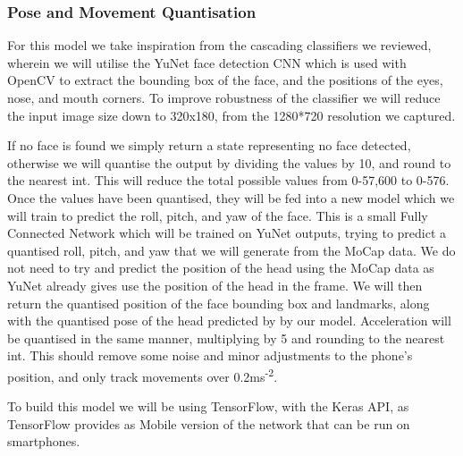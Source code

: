 \subsubsection{Pose and Movement Quantisation}\nl
For this model we take inspiration from the cascading classifiers we reviewed\cite{kim2017real, neto2012real, francone2011using,viola2004robust}, wherein we will utilise the YuNet face detection CNN\cite{yu2022yunet} which is used with OpenCV to extract the bounding box of the face, and the positions of the eyes, nose, and mouth corners. To improve robustness of the classifier we will reduce the input image size down to 320x180, from the 1280*720 resolution we captured.

If no face is found we simply return a state representing no face detected, otherwise we will quantise the output by dividing the values by 10, and round to the nearest int. This will reduce the total possible values from 0-57,600 to 0-576.
Once the values have been quantised, they will be fed into a new model which we will train to predict the roll, pitch, and yaw of the face.
This is a small Fully Connected Network which will be trained on YuNet outputs, trying to predict a quantised roll, pitch, and yaw that we will generate from the MoCap data.
We do not need to try and predict the position of the head using the MoCap data as YuNet already gives use the position of the head in the frame. We will then return the quantised position of the face bounding box and landmarks, along with the quantised pose of the head predicted by by our model.
Acceleration will be quantised in the same manner, multiplying by 5 and rounding to the nearest int. This should remove some noise and minor adjustments to the phone's position, and only track movements over 0.2ms\textsuperscript{-2}.

To build this model we will be using TensorFlow, with the Keras API, as TensorFlow provides as Mobile version of the network that can be run on smartphones.


